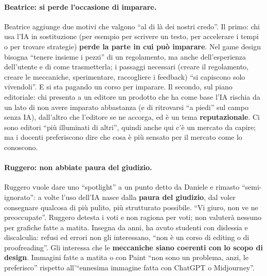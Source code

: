 \paragraph{Beatrice: si perde l'occasione di imparare.} Beatrice aggiunge due
motivi che valgono ``al di là dei nostri credo''. Il primo: chi usa l'IA in
sostituzione (per esempio per scrivere un testo, per accelerare i tempi o per
trovare strategie) \textbf{perde la parte in cui può imparare}. Nel game design
bisogna ``tenere insieme i pezzi'' di un regolamento, ma anche dell'esperienza
dell'utente e di come trasmetterla; i passaggi necessari (creare il regolamento,
creare le meccaniche, sperimentare, raccogliere i feedback) ``si capiscono solo
vivendoli''. E si sta pagando un corso per imparare. Il secondo, sul piano
editoriale: chi presenta a un editore un prodotto che ha come base l'IA rischia
da un lato di non avere imparato abbastanza (e di ritrovarsi ``a piedi'' sul
campo senza IA), dall'altro che l'editore se ne accorga, ed è un tema
\textbf{reputazionale}. Ci sono editori ``più illuminati di altri'', quindi
anche qui c'è un mercato da capire; ma i docenti preferiscono dire che cosa è
più sensato per il mercato come lo conoscono.

\paragraph{Ruggero: non abbiate paura del giudizio.} Ruggero vuole dare uno
``spotlight'' a un punto detto da Daniele e rimasto ``semi-ignorato'': a volte
l'uso dell'IA nasce dalla \textbf{paura del giudizio}, dal voler consegnare
qualcosa di più pulito, più strutturato possibile. ``Vi giuro, non ve ne
preoccupate''. Ruggero detesta i voti e non ragiona per voti; non valuterà
nessuno per grafiche fatte a matita. Insegna da anni, ha avuto studenti con
dislessia e discalculia: refusi ed errori non gli interessano, ``non è un corso
di editing o di proofreading''. Gli interessa che le \textbf{meccaniche siano
coerenti con lo scopo di design}. Immagini fatte a matita o con Paint ``non sono
un problema, anzi, le preferisco'' rispetto all'``ennesima immagine fatta con
ChatGPT o Midjourney''.

